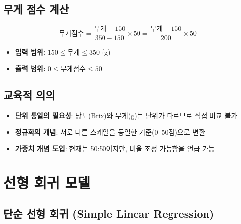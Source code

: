 \documentclass[11pt,a4paper]{article}
\begin{document}
\subsection{ 무게 점수 계산}

\begin{tcolorbox}[colback=lightblue,colframe=darkblue,title=\textbf{무게 점수 공식}]
\begin{equation}
\text{무게점수} = \frac{\text{무게} - 150}{350 - 150} \times 50 = \frac{\text{무게} - 150}{200} \times 50
\end{equation}

\begin{itemize}
    \item \textbf{입력 범위:} $150 \leq \text{무게} \leq 350$ (g)
    \item \textbf{출력 범위:} $0 \leq \text{무게점수} \leq 50$
\end{itemize}
\end{tcolorbox}

\subsection{ 교육적 의의}

\begin{tcolorbox}[colback=lightyellow,colframe=orange,title=\textbf{수업 활용 포인트}]
\begin{itemize}
    \item \textbf{단위 통일의 필요성}: 당도(Brix)와 무게(g)는 단위가 다르므로 직접 비교 불가
    \item \textbf{정규화의 개념}: 서로 다른 스케일을 동일한 기준(0--50점)으로 변환
    \item \textbf{가중치 개념 도입}: 현재는 50:50이지만, 비율 조정 가능함을 언급 가능
\end{itemize}
\end{tcolorbox}

\section{ 선형 회귀 모델}

\subsection{단순 선형 회귀 (Simple Linear Regression)}
\end{document}
